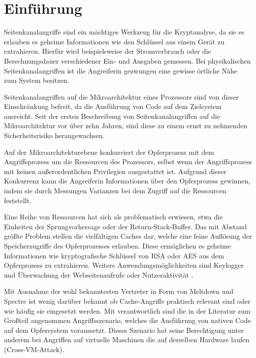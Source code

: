 \chapter{Einführung}
\label{chapter:introduction}


Seitenkanalangriffe sind ein mächtiges Werkzeug für die Kryptanalyse, da sie es erlauben es geheime Informationen wie den Schlüssel aus einem Gerät zu extrahieren.
Hierfür wird beispielsweise der Stromverbrauch oder die Berechnungsdauer verschiedener Ein- und Ausgaben gemessen.
Bei physikalischen Seitenkanalangriffen ist die Angreiferin gezwungen eine gewisse örtliche Nähe zum System besitzen.

Seitenkanalangriffen auf die Mikroarchitektur eines Prozessors sind von dieser Einschränkung befreit, da die
Ausführung von Code auf dem Zielsystem ausreicht.
Seit der ersten Beschreibung von Seitenkanalangriffen auf die Mikroarchitektur vor über zehn Jahren, sind diese zu einem ernst zu nehmenden Sicherheitsrisiko herangewachsen.

Auf der Mikroarchitekturebene konkurriert der Opferprozess mit dem Angriffsprozess um die Ressourcen des Prozessors, selbst wenn der Angriffsprozess mit keinen außerordentlichen Privilegien ausgestattet ist.
Aufgrund dieser Konkurrenz kann die Angreiferin Informationen über den Opferprozess gewinnen, indem sie durch Messungen Varianzen bei dem Zugriff auf die Ressourcen feststellt.

Eine Reihe von Ressourcen hat sich als problematisch erwiesen, etwa die Einheiten der Sprungvorhersage oder der Return-Stack-Buffer.
Das mit Abstand größte Problem stellen die vielfältigen Caches dar, welche eine feine Auflösung der Speicherzugriffe des Opferprozesses erlauben.
Diese ermöglichen es geheime Informationen wie kryptografische Schlüssel von RSA \cite{CacheBleedOpenSSLRSA} oder AES \cite{BernsteinAES} aus dem Opferprozess zu extrahieren.
Weitere Anwendungsmöglichkeiten sind Keylogger \cite{Keylogger} und Überwachung der Webseitenaufrufe oder Nutzeraktivität \cite{TheSpyInTheSandbox}.

Mit Ausnahme der wohl bekanntesten Vertreter in Form von Meltdown und Spectre ist wenig darüber bekannt ob Cache-Angriffe praktisch relevant sind oder wie häufig sie eingesetzt werden.
Mit verantwortlich sind die in der Literatur zum Großteil angenommen Angriffsszenario, welches die Ausführung von nativen Code auf dem Opfersystem voraussetzt.
Dieses Szenario hat seine Berechtigung unter anderem bei Angriffen auf virtuelle Maschinen die auf derselben Hardware laufen (Cross-VM-Attack).


